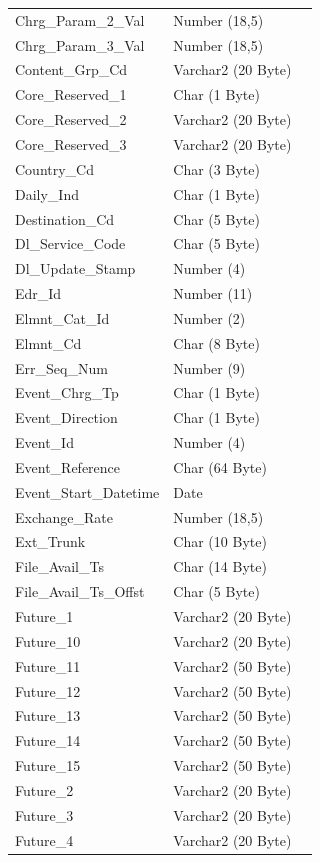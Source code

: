 \documentclass[12pt,twoside]{article}
\begin{document}
\begin{longtable}{l|l|l}
Chrg\_Param\_2\_Val & Number (18,5) & \\
Chrg\_Param\_3\_Val & Number (18,5) & \\
Content\_Grp\_Cd & Varchar2 (20 Byte) & \\
Core\_Reserved\_1 & Char (1 Byte) & \\
Core\_Reserved\_2 & Varchar2 (20 Byte) & \\
Core\_Reserved\_3 & Varchar2 (20 Byte) & \\
Country\_Cd & Char (3 Byte) & \\
Daily\_Ind & Char (1 Byte) & \\
Destination\_Cd & Char (5 Byte) & \\
Dl\_Service\_Code & Char (5 Byte) & \\
Dl\_Update\_Stamp & Number (4) & \\
Edr\_Id & Number (11) & \\
Elmnt\_Cat\_Id & Number (2) & \\
Elmnt\_Cd & Char (8 Byte) & \\
Err\_Seq\_Num & Number (9) & \\
Event\_Chrg\_Tp & Char (1 Byte) & \\
Event\_Direction & Char (1 Byte) & \\
Event\_Id & Number (4) & \\
Event\_Reference & Char (64 Byte) & \\
Event\_Start\_Datetime & Date & \\
Exchange\_Rate & Number (18,5) & \\
Ext\_Trunk & Char (10 Byte) & \\
File\_Avail\_Ts & Char (14 Byte) & \\
File\_Avail\_Ts\_Offst & Char (5 Byte) & \\
Future\_1 & Varchar2 (20 Byte) & \\
Future\_10 & Varchar2 (20 Byte) & \\
Future\_11 & Varchar2 (50 Byte) & \\
Future\_12 & Varchar2 (50 Byte) & \\
Future\_13 & Varchar2 (50 Byte) & \\
Future\_14 & Varchar2 (50 Byte) & \\
Future\_15 & Varchar2 (50 Byte) & \\
Future\_2 & Varchar2 (20 Byte) & \\
Future\_3 & Varchar2 (20 Byte) & \\
Future\_4 & Varchar2 (20 Byte) & \\

\end{longtable}
\end{document}
